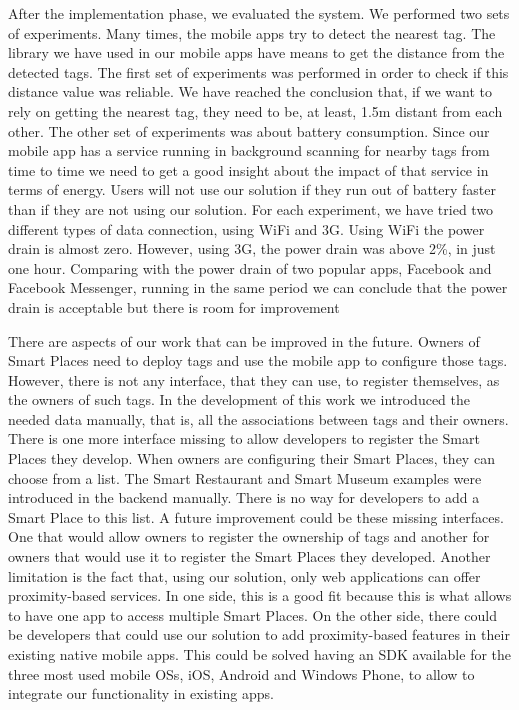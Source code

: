 After the implementation phase, we evaluated the system.
We performed two sets of experiments.
Many times, the mobile apps try to detect the nearest tag.
The library we have used in our mobile apps have means to get the distance from the detected tags.
The first set of experiments was performed in order to check if this distance value was reliable.
We have reached the conclusion that, if we want to rely on getting the nearest tag, they need to be, at least, 1.5m distant from each other.
The other set of experiments was about battery consumption.
Since our mobile app has a service running in background scanning for nearby tags from time to time we need to get a good insight about the impact of that service in terms of energy.
Users will not use our solution if they run out of battery faster than if they are not using our solution.
For each experiment, we have tried two different types of data connection, using \gls{WiFi} and \gls{3G}.
Using \gls{WiFi} the power drain is almost zero.
However, using \gls{3G}, the power drain was above 2\%, in just one hour.
Comparing with the power drain of two popular apps, Facebook and Facebook Messenger, running in the same period we can conclude that the power drain is acceptable but there is room for improvement

There are aspects of our work that can be improved in the future.
Owners of Smart Places need to deploy tags and use the mobile app to configure those tags.
However, there is not any interface, that they can use, to register themselves, as the owners of such tags.
In the development of this work we introduced the needed data manually, that is,
all the associations between tags and their owners.
There is one more interface missing to allow developers to register the Smart Places they develop.
When owners are configuring their Smart Places, they can choose from a list.
The Smart Restaurant and Smart Museum examples were introduced in the backend manually.
There is no way for developers to add a Smart Place to this list.
A future improvement could be these missing interfaces.
One that would allow owners to register the ownership of tags and another for owners that would use it to register the Smart Places they developed.
Another limitation is the fact that, using our solution, only web applications can offer proximity-based services.
In one side, this is a good fit because this is what allows to have one app to access multiple Smart Places.
On the other side, there could be developers that could use our solution to add proximity-based features in their existing native mobile apps.
This could be solved having an \gls{SDK} available for the three most used mobile \glspl{OS}, iOS, Android and Windows Phone, to allow to integrate our functionality in existing apps.

